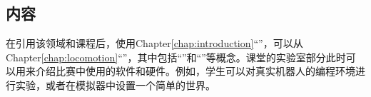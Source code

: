 


\subsection{内容}
\label{sec:curr1content}
在引用该领域和课程后，使用Chapter\ref{chap:introduction}“”，可以从Chapter\ref{chap:locomotion}“”，其中包括“”和“”等概念。课堂的实验室部分此时可以用来介绍比赛中使用的软件和硬件。例如，学生可以对真实机器人的编程环境进行实验，或者在模拟器中设置一个简单的世界。

